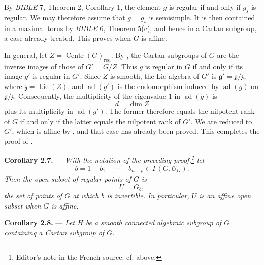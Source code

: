 By \emph{BIBLE} 7, Theorem 2, Corollary 1, the element \(g\) is
regular if and only if \(g_s\) is regular. We may therefore assume
that \(g=g_s\) is semisimple. It is then contained in a maximal torus
by \emph{BIBLE} 6, Theorem 5(c), and hence in a Cartan subgroup, a
case already treated. This proves  when \(G\) is affine.

In general, let \(Z=\operatorname{Centr}(G)_{\mathrm{red}}\). By
, the Cartan subgroups of \(G\) are the inverse images of
those of \(G'=G/Z\). Thus \(g\) is regular in \(G\) if and only if
its image \(g'\) is regular in \(G'\). Since \(Z\) is smooth, the Lie
algebra of \(G'\) is
\(\mathfrak g'=\mathfrak g/\mathfrak z\), where
\(\mathfrak z=\operatorname{Lie}(Z)\), and
\(\operatorname{ad}(g')\) is the endomorphism induced by
\(\operatorname{ad}(g)\) on \(\mathfrak g/\mathfrak z\).
Consequently, the multiplicity of the eigenvalue \(1\) in
\(\operatorname{ad}(g)\) is
\[
  d=\dim Z
\]
plus its multiplicity in \(\operatorname{ad}(g')\). The former
therefore equals the nilpotent rank of \(G\) if and only if the latter
equals the nilpotent rank of \(G'\). We are reduced to \(G'\), which
is affine by , and that case has already been proved. This
completes the proof of .

\medskip
\noindent{}\textbf{Corollary 2.7.} ---
\textit{With the notation of the preceding proof,\footnote{Editor's
note in the French source: cf.  above.} let}
\[
  b=1+b_1+\cdots+b_{n-\rho}\in\Gamma(G,\mathcal O_G).
\]
\textit{Then the open subset of regular points of \(G\) is}
\[
  U=G_b,
\]
\textit{the set of points of \(G\) at which \(b\) is invertible. In
particular, \(U\) is an affine open subset when \(G\) is affine.}

\medskip
\noindent{}\textbf{Corollary 2.8.} ---
\textit{Let \(H\) be a smooth connected algebraic subgroup of \(G\)
containing a Cartan subgroup of \(G\).}

